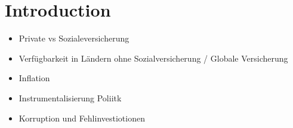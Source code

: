 \section{Introduction}

\begin{itemize}
\item Private vs Sozialeversicherung
\item Verfügbarkeit in Ländern ohne Sozialversicherung / Globale Versicherung
\item Inflation
\item Instrumentalisierung Poliitk
\item Korruption und Fehlinvestiotionen
\end{itemize}

